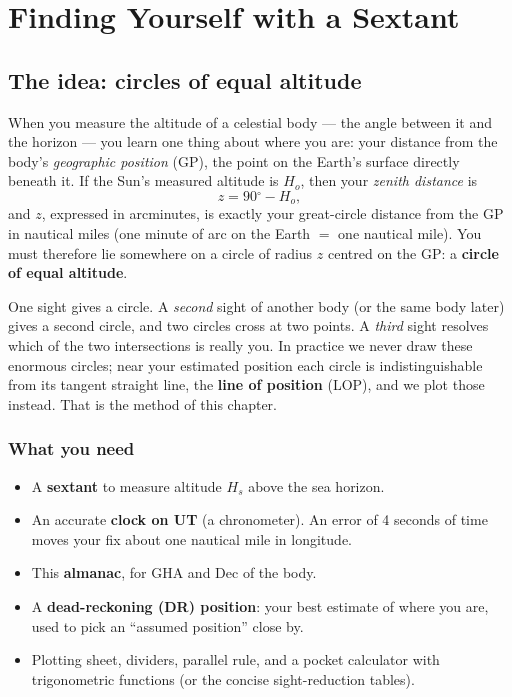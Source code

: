 \documentclass[10pt,letterpaper,twoside]{book}
\newcommand{\dg}{\ensuremath{{}^{\circ}}}
\begin{document}
\tableofcontents

\mainmatter

\part{Finding Yourself with a Sextant}
\chapter{The idea: circles of equal altitude}

When you measure the altitude of a celestial body --- the angle between it and
the horizon --- you learn one thing about where you are: your distance from the
body's \emph{geographic position} (GP), the point on the Earth's surface directly
beneath it. If the Sun's measured altitude is $H_o$, then your \emph{zenith
distance} is
\[
  z = 90\dg - H_o ,
\]
and $z$, expressed in arcminutes, is exactly your great-circle distance from the
GP in nautical miles (one minute of arc on the Earth $=$ one nautical mile). You
must therefore lie somewhere on a circle of radius $z$ centred on the GP: a
\textbf{circle of equal altitude}.

One sight gives a circle. A \emph{second} sight of another body (or the same body
later) gives a second circle, and two circles cross at two points. A \emph{third}
sight resolves which of the two intersections is really you. In practice we never
draw these enormous circles; near your estimated position each circle is
indistinguishable from its tangent straight line, the \textbf{line of position}
(LOP), and we plot those instead. That is the method of this chapter.

\section{What you need}
\begin{itemize}[nosep]
\item A \textbf{sextant} to measure altitude $H_s$ above the sea horizon.
\item An accurate \textbf{clock on UT} (a chronometer). An error of 4 seconds of
      time moves your fix about one nautical mile in longitude.
\item This \textbf{almanac}, for GHA and Dec of the body.
\item A \textbf{dead-reckoning (DR) position}: your best estimate of where you are,
      used to pick an ``assumed position'' close by.
\item Plotting sheet, dividers, parallel rule, and a pocket calculator with
      trigonometric functions (or the concise sight-reduction tables).
\end{itemize}
\end{document}

